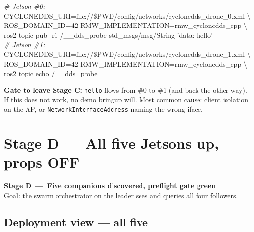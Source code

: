 \documentclass[11pt,a4paper]{article}
\newcommand{\stagebanner}[3]{%
  \begin{tcolorbox}[colback=stagebg, colframe=stagerule, boxrule=1pt, arc=3pt,
                    left=0.6cm, right=0.6cm, top=0.4cm, bottom=0.4cm,
                    fontupper=\large]
  \textbf{Stage #1 \,---\, #2}\\[2pt]
  \small\textcolor{linegrey}{Goal: #3}
  \end{tcolorbox}%
}
\begin{document}
\begin{center}
\begin{tcolorbox}[colback=bggrey, colframe=fcblue!60, boxrule=0.6pt, arc=2pt,
                  width=15cm, fontupper=\footnotesize\ttfamily]
\textcolor{linegrey}{\itshape \# Jetson \#0:}\\
CYCLONEDDS\_URI=file://\$PWD/config/networks/cyclonedds\_drone\_0.xml \textbackslash\\
ROS\_DOMAIN\_ID=42 RMW\_IMPLEMENTATION=rmw\_cyclonedds\_cpp \textbackslash\\
ros2 topic pub -r1 /\_\_dds\_probe std\_msgs/msg/String '{data: hello}'\\[6pt]
\textcolor{linegrey}{\itshape \# Jetson \#1:}\\
CYCLONEDDS\_URI=file://\$PWD/config/networks/cyclonedds\_drone\_1.xml \textbackslash\\
ROS\_DOMAIN\_ID=42 RMW\_IMPLEMENTATION=rmw\_cyclonedds\_cpp \textbackslash\\
ros2 topic echo /\_\_dds\_probe
\end{tcolorbox}
\end{center}

\begin{tcolorbox}[colback=accentgreen!8, colframe=accentgreen, boxrule=0.8pt, arc=2pt]
\textbf{Gate to leave Stage C:} \texttt{hello} flows from \#0 to \#1 (and back the
other way). If this does not work, no demo bringup will. Most common cause:
client isolation on the AP, or \texttt{NetworkInterfaceAddress} naming the wrong iface.
\end{tcolorbox}

\newpage

\section{Stage D --- All five Jetsons up, props OFF}
\stagebanner{D}{Five companions discovered, preflight gate green}{the swarm orchestrator on the leader sees and queries all four followers.}

\subsection{Deployment view --- all five}
\end{document}

